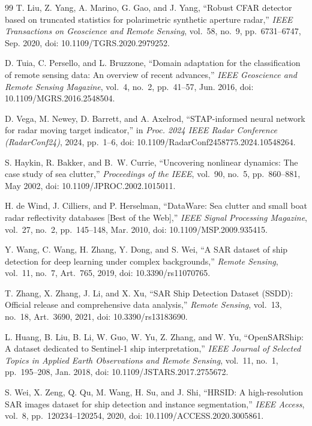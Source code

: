 \documentclass[journal]{IEEEtran}
\begin{document}
\begin{thebibliography}{99}
T. Liu, Z. Yang, A. Marino, G. Gao, and J. Yang, ``Robust CFAR detector based on truncated statistics for polarimetric synthetic aperture radar,'' \emph{IEEE Transactions on Geoscience and Remote Sensing}, vol.~58, no.~9, pp.~6731--6747, Sep. 2020, doi: 10.1109/TGRS.2020.2979252.

D. Tuia, C. Persello, and L. Bruzzone, ``Domain adaptation for the classification of remote sensing data: An overview of recent advances,'' \emph{IEEE Geoscience and Remote Sensing Magazine}, vol.~4, no.~2, pp.~41--57, Jun. 2016, doi: 10.1109/MGRS.2016.2548504.

D. Vega, M. Newey, D. Barrett, and A. Axelrod, ``STAP-informed neural network for radar moving target indicator,'' in \emph{Proc. 2024 IEEE Radar Conference (RadarConf24)}, 2024, pp.~1--6, doi: 10.1109/RadarConf2458775.2024.10548264.

S. Haykin, R. Bakker, and B.~W. Currie, ``Uncovering nonlinear dynamics: The case study of sea clutter,'' \emph{Proceedings of the IEEE}, vol.~90, no.~5, pp.~860--881, May 2002, doi: 10.1109/JPROC.2002.1015011.

H. de Wind, J. Cilliers, and P. Herselman, ``DataWare: Sea clutter and small boat radar reflectivity databases [Best of the Web],'' \emph{IEEE Signal Processing Magazine}, vol.~27, no.~2, pp.~145--148, Mar. 2010, doi: 10.1109/MSP.2009.935415.

Y. Wang, C. Wang, H. Zhang, Y. Dong, and S. Wei, ``A SAR dataset of ship detection for deep learning under complex backgrounds,'' \emph{Remote Sensing}, vol.~11, no.~7, Art.~765, 2019, doi: 10.3390/rs11070765.

T. Zhang, X. Zhang, J. Li, and X. Xu, ``SAR Ship Detection Dataset (SSDD): Official release and comprehensive data analysis,'' \emph{Remote Sensing}, vol.~13, no.~18, Art.~3690, 2021, doi: 10.3390/rs13183690.

L. Huang, B. Liu, B. Li, W. Guo, W. Yu, Z. Zhang, and W. Yu, ``OpenSARShip: A dataset dedicated to Sentinel-1 ship interpretation,'' \emph{IEEE Journal of Selected Topics in Applied Earth Observations and Remote Sensing}, vol.~11, no.~1, pp.~195--208, Jan. 2018, doi: 10.1109/JSTARS.2017.2755672.

S. Wei, X. Zeng, Q. Qu, M. Wang, H. Su, and J. Shi, ``HRSID: A high-resolution SAR images dataset for ship detection and instance segmentation,'' \emph{IEEE Access}, vol.~8, pp.~120234--120254, 2020, doi: 10.1109/ACCESS.2020.3005861.


\end{thebibliography}
\end{document}
